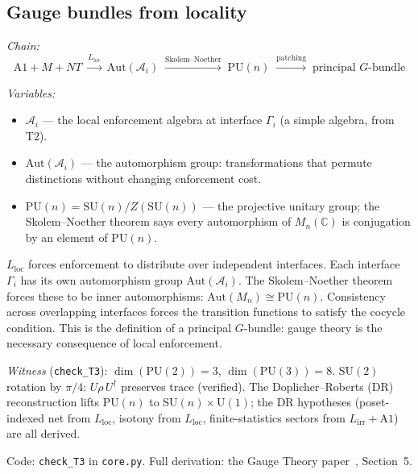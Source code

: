 \documentclass[11pt]{article}
\newcommand{\Lloc}{L_{\mathrm{loc}}}
\newcommand{\Lirr}{L_{\mathrm{irr}}}
\newcommand{\Aut}{\mathrm{Aut}}
\newcommand{\SU}{\mathrm{SU}}
\newcommand{\U}{\mathrm{U}}
\begin{document}
\subsection{Gauge bundles from locality}

\begin{tcolorbox}[apfbox, title={T3: Interface Automorphisms $\to$ Gauge Bundle}]
\textit{Chain:}
\begin{equation}
\text{A1} + M + NT \;\xrightarrow{\Lloc}\; \Aut(\mathcal{A}_i) \;\xrightarrow{\text{Skolem--Noether}}\; \text{PU}(n) \;\xrightarrow{\text{patching}}\; \text{principal } G\text{-bundle}
\end{equation}

\smallskip\noindent\textit{Variables:}
\begin{itemize}[nosep,leftmargin=2em]
\item $\mathcal{A}_i$ --- the local enforcement algebra at interface $\Gamma_i$ (a simple algebra, from T2).
\item $\Aut(\mathcal{A}_i)$ --- the automorphism group: transformations that permute distinctions without changing enforcement cost.
\item $\mathrm{PU}(n) = \SU(n)/Z(\SU(n))$ --- the projective unitary group; the Skolem--Noether theorem says every automorphism of $M_n(\mathbb{C})$ is conjugation by an element of $\mathrm{PU}(n)$.
\end{itemize}
\end{tcolorbox}

$\Lloc$ forces enforcement to distribute over independent interfaces.  Each interface $\Gamma_i$ has its own automorphism group $\Aut(\mathcal{A}_i)$.  The Skolem--Noether theorem forces these to be inner automorphisms: $\Aut(M_n) \cong \mathrm{PU}(n)$.  Consistency across overlapping interfaces forces the transition functions to satisfy the cocycle condition.  This is the definition of a principal $G$-bundle: gauge theory is the necessary consequence of local enforcement.

\textit{Witness} (\texttt{check\_T3}): $\dim(\mathrm{PU}(2)) = 3$, $\dim(\mathrm{PU}(3)) = 8$.  $\SU(2)$ rotation by $\pi/4$: $U\rho\, U^\dagger$ preserves trace (verified).  The Doplicher--Roberts (DR) reconstruction lifts PU$(n)$ to SU$(n) \times \U(1)$; the DR hypotheses (poset-indexed net from $\Lloc$, isotony from $\Lloc$, finite-statistics sectors from $\Lirr + \text{A1}$) are all derived.

Code: \texttt{check\_T3} in \texttt{core.py}.  Full derivation: the Gauge Theory paper~\cite{PGT}, Section~5.
\end{document}
